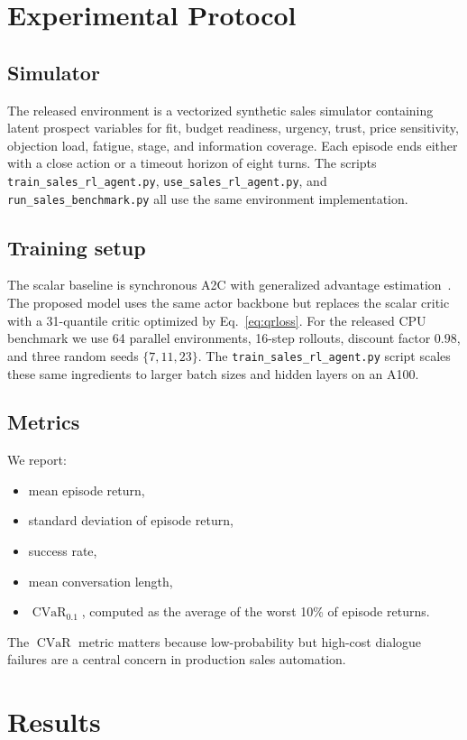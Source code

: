 \documentclass[conference]{IEEEtran}
\newcommand{\cvar}{\operatorname{CVaR}}
\begin{document}
\section{Experimental Protocol}
\subsection{Simulator}
The released environment is a vectorized synthetic sales simulator containing latent prospect variables for fit, budget readiness, urgency, trust, price sensitivity, objection load, fatigue, stage, and information coverage. Each episode ends either with a close action or a timeout horizon of eight turns. The scripts \texttt{train\_sales\_rl\_agent.py}, \texttt{use\_sales\_rl\_agent.py}, and \texttt{run\_sales\_benchmark.py} all use the same environment implementation.

\subsection{Training setup}
The scalar baseline is synchronous A2C with generalized advantage estimation~\cite{mnih2016a3c,schulman2016gae}. The proposed model uses the same actor backbone but replaces the scalar critic with a 31-quantile critic optimized by Eq.~\eqref{eq:qrloss}. For the released CPU benchmark we use 64 parallel environments, 16-step rollouts, discount factor \(0.98\), and three random seeds \(\{7,11,23\}\). The \texttt{train\_sales\_rl\_agent.py} script scales these same ingredients to larger batch sizes and hidden layers on an A100.

\subsection{Metrics}
We report:
\begin{itemize}
\item mean episode return,
\item standard deviation of episode return,
\item success rate,
\item mean conversation length,
\item \(\cvar_{0.1}\), computed as the average of the worst 10\% of episode returns.
\end{itemize}

The \(\cvar\) metric matters because low-probability but high-cost dialogue failures are a central concern in production sales automation.

\section{Results}
\end{document}
